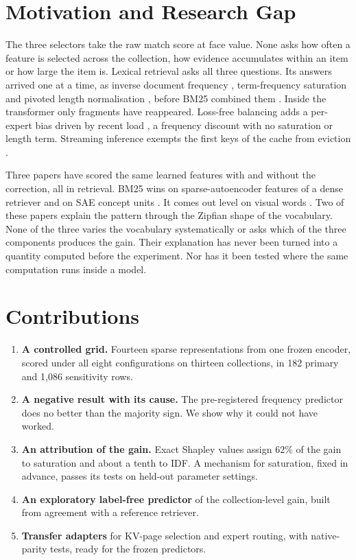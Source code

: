 \documentclass[11pt]{article}
\begin{document}
\section{Motivation and Research Gap}
\label{sec:motivation}

The three selectors take the raw match score at face value. None asks how often a
feature is selected across the collection, how evidence accumulates within an item or how
large the item is. Lexical retrieval asks all three questions. Its answers arrived one at
a time, as inverse document frequency \citep{sparckjones1972idf}, term-frequency
saturation \citep{robertson1994poisson} and pivoted length normalisation
\citep{singhal1996pivoted}, before BM25 combined them \citep{robertson2009bm25}. Inside
the transformer only fragments have reappeared. Loss-free balancing adds a per-expert bias
driven by recent load \citep{wang2024lossfree}, a frequency discount with no saturation or
length term. Streaming inference exempts the first keys of the cache from eviction
\citep{xiao2024streamingllm}.

Three papers have scored the same learned features with and without the correction, all
in retrieval. BM25 wins on sparse-autoencoder features of a dense retriever
\citep{clavie2026latent} and on SAE concept units \citep{park2025clsr}. It comes out level
on visual words \citep{han2026bm25v}. Two of these papers explain the pattern through the
Zipfian shape of the vocabulary. None of the three varies the vocabulary systematically
or asks which of the three components produces the gain. Their explanation has never been
turned into a quantity computed before the experiment. Nor has it been tested where
the same computation runs inside a model.

\section{Contributions}
\label{sec:contributions}

\begin{enumerate}
\item \textbf{A controlled grid.} Fourteen sparse representations from one frozen encoder,
scored under all eight configurations on thirteen collections, in 182 primary and
1{,}086 sensitivity rows.
\item \textbf{A negative result with its cause.} The pre-registered frequency predictor
does no better than the majority sign. We show why it could not have worked.
\item \textbf{An attribution of the gain.} Exact Shapley values assign $62\%$ of the gain
to saturation and about a tenth to IDF. A mechanism for saturation, fixed in advance,
passes its tests on held-out parameter settings.
\item \textbf{An exploratory label-free predictor} of the collection-level gain, built
from agreement with a reference retriever.
\item \textbf{Transfer adapters} for KV-page selection and expert routing, with
native-parity tests, ready for the frozen predictors.
\end{enumerate}
\end{document}
